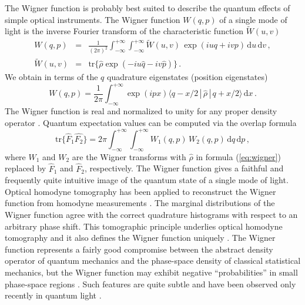 \documentclass[12pt,amsmath,amssymb]{article}
\numberwithin{equation}{section}
\begin{document}
The Wigner function
 \cite{Leonhardt,Moyal,Schleich,Tatarskii,Wigner}
is probably best
suited to describe the quantum effects of simple optical
instruments. The Wigner function $W(q,p)$ of a single mode of
light is the inverse Fourier transform of the characteristic
function $\widetilde{W}(u,v)$ \cite{Leonhardt}
\begin{eqnarray}
\label{eq:def} W(q,p) &=& \frac{1}{(2\pi)^2}
\int_{-\infty}^{+\infty} \int_{-\infty}^{+\infty}
\widetilde{W}(u,v)\, \exp(iuq+ivp)\,
\mathrm{d}u\,\mathrm{d}v \,, \nonumber\\
\widetilde{W}(u,v) &=&
\mathrm{tr}\{\hat{\rho}\exp(-iu\hat{q}-iv\hat{p})\} \,.
\end{eqnarray}
We obtain \cite{Leonhardt} in terms of the $q$ quadrature
eigenstates (position eigenstates)
\begin{equation}
\label{eq:wigner} W(q,p) = \frac{1}{2\pi}
\int_{-\infty}^{+\infty} \exp(ipx) \langle
q-x/2\,|\,\hat{\rho}\,|\,q+x/2\rangle\,\mathrm{d}x \,.
\end{equation}
The Wigner function is real and normalized to unity for any
proper density operator \cite{Leonhardt}. Quantum expectation
values can be computed via the overlap formula \cite{Leonhardt}
\begin{equation}
\label{eq:overlap} \mathrm{tr}\{\hat{F}_1\hat{F_2}\} = 2\pi
\int_{-\infty}^{+\infty} \int_{-\infty}^{+\infty}
W_1(q,p)\,W_2(q,p)\, \mathrm{d}q\,\mathrm{d}p \,,
\end{equation}
where $W_1$ and $W_2$ are the Wigner transforms with $\hat{\rho}$
in formula (\ref{eq:wigner}) replaced by $\hat{F}_1$ and
$\hat{F}_2$, respectively. The Wigner function gives a faithful
and frequently quite intuitive image of the quantum state of a
single mode of light. Optical homodyne tomography has been
applied to reconstruct the Wigner function from homodyne
measurements \cite{Breitenbach,Leonhardt,Lvovsky,Smithey,Welsch}.
The marginal distributions of the Wigner function agree with
the correct quadrature histograms
with respect to an arbitrary phase shift.
This tomographic principle underlies optical homodyne tomography
and it also defines the Wigner function
uniquely \cite{Bertrand,Leonhardt}. The Wigner
function represents a fairly good compromise between the abstract density
operator of quantum mechanics and the phase-space density of
classical statistical mechanics, but the Wigner function may
exhibit negative ``probabilities'' in small phase-space regions
\cite{Leonhardt}. Such features are quite subtle and have been
observed only recently in quantum light \cite{Bertet,Lvovsky}.
\end{document}
